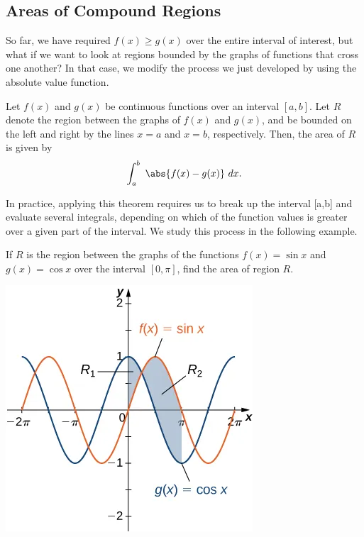 \documentclass{report}
\begin{document}
    \subsection*{Areas of Compound Regions}
    \bigbreak \noindent 
    So far, we have required  $f(x) \geq g(x)$ over the entire interval of interest, but what if we want to look at regions bounded by the graphs of functions that cross one another? In that case, we modify the process we just developed by using the absolute value function.
    \bigbreak \noindent 
    \begin{thrm}
        Let \( f(x) \) and \( g(x) \) be continuous functions over an interval \([a, b]\).
        Let \( R \) denote the region between the graphs of \( f(x) \) and \( g(x) \),
        and be bounded on the left and right by the lines \( x = a \) and \( x = b \), respectively.
        Then, the area of \( R \) is given by
       \begin{align*}
          \int_{a}^{b}\ \abs{f(x)-g(x)}\ dx 
       .\end{align*} 
    \end{thrm}
    \bigbreak \noindent 
    In practice, applying this theorem requires us to break up the interval [a,b] and evaluate several integrals, depending on which of the function values is greater over a given part of the interval. We study this process in the following example.
    \bigbreak \noindent 
    \begin{eg}
       If \( R \) is the region between the graphs of the functions \( f(x) = \sin x \) and \( g(x) = \cos x \) over the interval \([0, \pi]\), find the area of region \( R \).
    \end{eg}
    \bigbreak \noindent 
    \begin{minipage}{0.47\textwidth}
        \begin{center}
            \includegraphics[scale=0.5]{./figures/51be43c1-417e-4df2-a3d0-7d6ec562ccb2.png}
        \end{center}
    \end{minipage}
\end{document}
